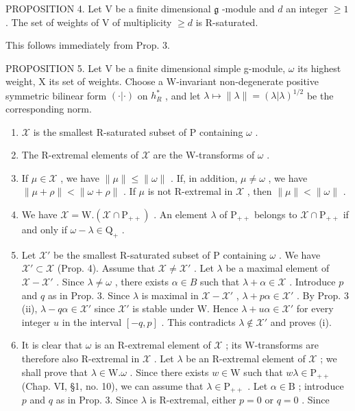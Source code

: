 PROPOSITION 4. Let \(\mathrm{V}\) be a finite dimensional \(\mathfrak{g}\) -module and \(d\) an integer \(\geq 1\) . The set of weights of \(\mathrm{V}\) of multiplicity \(\geq d\) is R-saturated.

This follows immediately from Prop. 3.

PROPOSITION 5. Let V be a finite dimensional simple g-module, \(\omega\) its highest weight, X its set of weights. Choose a W-invariant non-degenerate positive symmetric bilinear form \((\cdot|\cdot)\) on \(h_{R}^{*}\) , and let \(\lambda\mapsto\|\lambda\|=(\lambda|\lambda)^{1/2}\) be the corresponding norm.

\begin{enumerate}
\def\labelenumi{(\roman{enumi})}
\item
  \(\mathcal{X}\) is the smallest R-saturated subset of P containing \(\omega\) .
\item
  The R-extremal elements of \(\mathcal{X}\) are the W-transforms of \(\omega\) .
\item
  If \(\mu \in \mathcal{X}\) , we have \(\| \mu \| \leq \| \omega \|\) . If, in addition, \(\mu \neq \omega\) , we have \(\| \mu + \rho \| < \| \omega + \rho \|\) . If \(\mu\) is not R-extremal in \(\mathcal{X}\) , then \(\| \mu \| < \| \omega \|\) .
\item
  We have \(\mathcal{X} = \mathrm{W.}(\mathcal{X}\cap \mathrm{P}_{++})\) . An element \(\lambda\) of \(\mathrm{P}_{++}\) belongs to \(\mathcal{X}\cap \mathrm{P}_{++}\) if and only if \(\omega -\lambda \in \mathrm{Q}_{+}\) .
\item
  Let \(\mathcal{X}'\) be the smallest R-saturated subset of P containing \(\omega\) . We have \(\mathcal{X}' \subset \mathcal{X}\) (Prop. 4). Assume that \(\mathcal{X} \neq \mathcal{X}'\) . Let \(\lambda\) be a maximal element of \(\mathcal{X} - \mathcal{X}'\) . Since \(\lambda \neq \omega\) , there exists \(\alpha \in B\) such that \(\lambda + \alpha \in \mathcal{X}\) . Introduce \(p\) and \(q\) as in Prop. 3. Since \(\lambda\) is maximal in \(\mathcal{X} - \mathcal{X}'\) , \(\lambda + p\alpha \in \mathcal{X}'\) . By Prop. 3 (ii), \(\lambda - q\alpha \in \mathcal{X}'\) since \(\mathcal{X}'\) is stable under W. Hence \(\lambda + u\alpha \in \mathcal{X}'\) for every integer \(u\) in the interval \([-q, p]\) . This contradicts \(\lambda \notin \mathcal{X}'\) and proves (i).
\item
  It is clear that \(\omega\) is an R-extremal element of \(\mathcal{X}\) ; its W-transforms are therefore also R-extremal in \(\mathcal{X}\) . Let \(\lambda\) be an R-extremal element of \(\mathcal{X}\) ; we shall prove that \(\lambda \in \mathrm{W}.\omega\) . Since there exists \(w \in \mathrm{W}\) such that \(w\lambda \in \mathrm{P}_{++}\) (Chap. VI, §1, no. 10), we can assume that \(\lambda \in \mathrm{P}_{++}\) . Let \(\alpha \in \mathrm{B}\) ; introduce \(p\) and \(q\) as in Prop. 3. Since \(\lambda\) is R-extremal, either \(p = 0\) or \(q = 0\) . Since
\end{enumerate}

